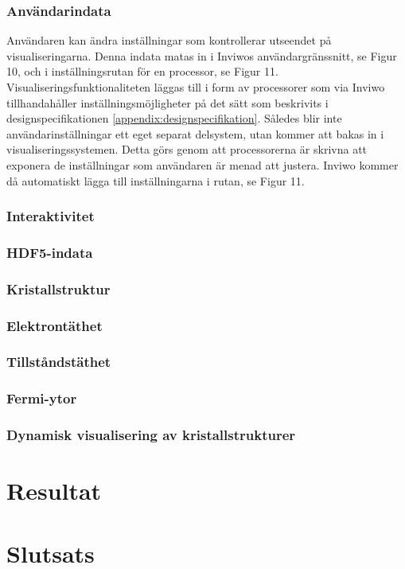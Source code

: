 \documentclass[a4paper,12pt]{article}
\begin{document}
\subsubsection{Användarindata}
Användaren kan ändra inställningar som kontrollerar utseendet på visualiseringarna.
Denna indata matas in i Inviwos användargränssnitt, %
se Figur 10, och i inställningsrutan för en processor, %
se Figur 11.
Visualiseringsfunktionaliteten läggas till i form av processorer som via Inviwo tillhandahåller inställningsmöjligheter på det sätt som beskrivits i designspecifikationen \ref{appendix:designspecifikation}. Således blir inte användarinställningar ett eget separat delsystem, utan kommer att bakas in i visualiseringssystemen. Detta görs genom att processorerna är skrivna att exponera de inställningar som användaren är menad att
justera. Inviwo kommer då automatiskt lägga till inställningarna i rutan, se %
Figur 11.
\subsubsection{Interaktivitet}
\subsubsection{HDF5-indata}
\subsubsection{Kristallstruktur}
\subsubsection{Elektrontäthet}
\subsubsection{Tillståndstäthet}
\subsubsection{Fermi-ytor}
\subsubsection{Dynamisk visualisering av kristallstrukturer}

\section{Resultat}

\section{Slutsats}
\end{document}

